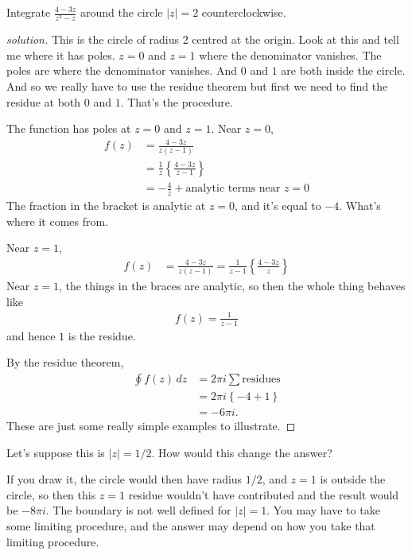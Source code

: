 \begin{example}
    Integrate $\frac{4 - 3z}{z^2 - z}$
    around the circle $|z|=2$ counterclockwise.
\end{example}
\begin{proof}[solution]
    This is the circle of radius 2 centred at the origin.
    Look at this and tell me where it has poles.
    $z=0$ and $z=1$ where the denominator vanishes.
    The poles are where the denominator vanishes.
    And $0$ and $1$ are both inside the circle.
    And so we really have to use the residue theorem
    but first we need to find the residue at both $0$ and $1$.
    That's the procedure.

    The function has poles at $z=0$ and $z=1$.
    Near $z=0$,
    \begin{align}
        f(z) &=
        \frac{4 - 3z}{z(z - 1)}\\
        &= \frac{1}{z}\left\{
            \frac{4 - 3z}{z - 1}
        \right\}\\
        &= -\frac{4}{z} + \text{analytic terms near $z=0$}
    \end{align}
    The fraction in the bracket is analytic at $z=0$,
    and it's equal to $-4$.
    What's where it comes from.

    Near $z=1$,
    \begin{align}
        f(z) &=
        \frac{4 - 3z}{z(z - 1)}
        = \frac{1}{z - 1}\left\{
            \frac{4 - 3z}{z}
        \right\}
    \end{align}
    Near $z=1$, the things in the braces are analytic,
    so then the whole thing behaves like
    \begin{align}
        f(z) = \frac{1}{z - 1}
    \end{align}
    and hence $1$ is the residue.
    
    By the residue theorem,
    \begin{align}
        \oint f(z)\, dz &= 2\pi i\sum \text{residues}\\
        &= 2\pi i \left\{ -4 + 1 \right\}\\
        &= -6\pi i.
    \end{align}
    These are just some really simple examples to illustrate.
\end{proof}
Let's suppose this is $|z|=1/2$.
How would this change the answer?

If you draw it,
the circle would then have radius $1/2$,
and $z=1$ is outside the circle,
so then this $z=1$ residue wouldn't have contributed
and the result would be $-8\pi i$.
The boundary is not well defined for $|z|=1$.
You may have to take some limiting procedure,
and the answer may depend on how you take that limiting procedure.

